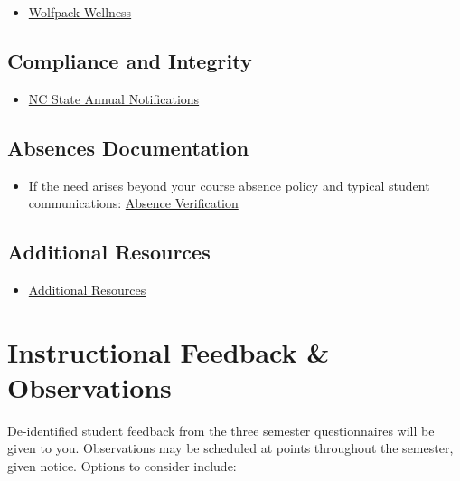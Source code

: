 \documentclass[
]{book}
\providecommand{\tightlist}{%
  \setlength{\itemsep}{0pt}\setlength{\parskip}{0pt}}
\begin{document}
\begin{itemize}
\tightlist
\item
  \href{https://wellness.ncsu.edu/wellness-day/}{Wolfpack Wellness}
\end{itemize}

\section{Compliance and Integrity}\label{compliance-and-integrity}

\begin{itemize}
\tightlist
\item
  \href{https://compliance.ncsu.edu/annual-notices/?utm_source=newsletter&utm_medium=email&utm_campaign=annual-campus-notifications}{NC State Annual Notifications}
\end{itemize}

\section{Absences Documentation}\label{absences-documentation}

\begin{itemize}
\tightlist
\item
  If the need arises beyond your course absence policy and typical student communications: \href{https://dasa.ncsu.edu/support-and-advocacy/find-help/absence-notification/}{Absence Verification}
\end{itemize}

\section{Additional Resources}\label{additional-resources}

\begin{itemize}
\tightlist
\item
  \href{https://docs.google.com/document/d/1XHivvQ13iZ-qqvm77h7R1OTw4cIv1VwA/edit?usp=sharing&ouid=112414287104912137071&rtpof=true&sd=true}{Additional Resources}
\end{itemize}

\chapter{Instructional Feedback \& Observations}\label{instructional-feedback-observations}

De-identified student feedback from the three semester questionnaires will be given to you. Observations may be scheduled at points throughout the semester, given notice. Options to consider include:
\end{document}
